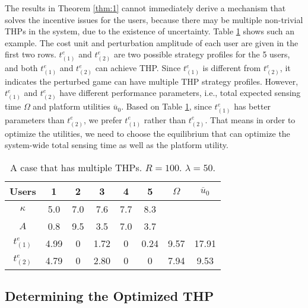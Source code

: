 \documentclass{IEEEtran}
\begin{document}
The results in Theorem \ref{thm:1} cannot immediately derive a mechanism that solves the incentive issues for the users, because there may be multiple non-trivial THPs in the system, due to the existence of uncertainty. Table \ref{tab:example} shows such an example. The cost unit and perturbation amplitude of each user are given in the first two rows. $t_{(1)}^{e}$ and $t_{(2)}^{e}$ are two possible strategy profiles for the 5 users, and both $t_{(1)}^{e}$ and $t_{(2)}^{e}$ can achieve THP. Since $t_{(1)}^{e}$ is different from $t_{(2)}^{e}$, it indicates the perturbed game can have multiple THP strategy profiles. {\color{black}However, $t_{(1)}^{e}$ and $t_{(2)}^{e}$ have different performance parameters, i.e., total expected sensing time $\Omega$ and platform utilities $\overline{u}_0$. Based on Table \ref{tab:example}, since $t_{(1)}^{e}$ has better parameters than $t_{(2)}^{e}$, we prefer $t_{(1)}^{e}$ rather than $t_{(2)}^{e}$.} That means in order to optimize the utilities, we need to choose the equilibrium that can optimize the system-wide total sensing time as well as the platform utility. %

\begin{table}[!t]
\centering
\begin{tabular}{c | c c c c c | c | c}
Users	&	1	&	2	&	3	&	4	&	5 & $\Omega$ & $\overline{u}_0$\\
\hline
$\kappa$	&	5.0	&	7.0	&	7.6	&	7.7	&	8.3 & &\\
$A$	&	0.8 & 9.5 & 3.5 & 7.0 & 3.7 & &\\
$t_{(1)}^{e}$ & 4.99 & 0 & 1.72 & 0 & 0.24 & 9.57 & 17.91\\
$t_{(2)}^{e}$ & 4.79 & 0 & 2.80 & 0 & 0 & 7.94 & 9.53\\
\hline
\end{tabular}
\caption{A case that has multiple THPs. $R=100$. $\lambda=50$.}
\label{tab:example}
\end{table}

\subsection{Determining the Optimized THP}
\end{document}
